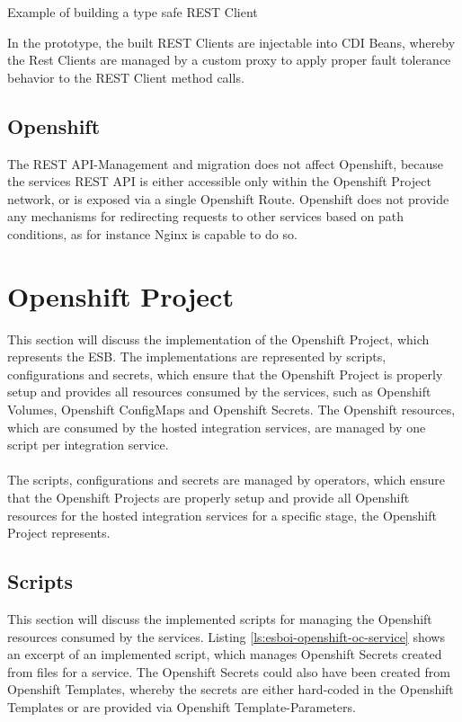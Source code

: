 \begin{listing}[h]
	\caption{Example of building a type safe REST Client}
	\label{ls:esboi-api-client-api-builder-java}
\end{listing}

In the prototype, the built REST Clients are injectable into CDI Beans, whereby the Rest Clients are managed by a custom proxy to apply proper fault tolerance behavior to the REST Client method calls.

\subsection{Openshift}
\label{sec:esbi-api-openshift}
The REST API-Management and migration does not affect Openshift, because the services REST API is either accessible only within the Openshift Project network, or is exposed via a single Openshift Route. Openshift does not provide any mechanisms for redirecting requests to other services based on path conditions, as for instance Nginx is capable to do so. 

\section{Openshift Project}
\label{sec:esbi-openshift}
This section will discuss the implementation of the Openshift Project, which represents the ESB. The implementations are represented by scripts, configurations and secrets, which ensure that the Openshift Project is properly setup and provides all resources consumed by the services, such as Openshift Volumes, Openshift ConfigMaps and Openshift Secrets. The Openshift resources, which are consumed by the hosted integration services, are managed by one script per integration service. 
\\ \\
The scripts, configurations and secrets are managed by operators, which ensure that the Openshift Projects are properly setup and provide all Openshift resources for the hosted integration services for a specific stage, the Openshift Project represents.

\subsection{Scripts}
\label{sec:esbi-openshift-secrets}
This section will discuss the implemented scripts for managing the Openshift resources consumed by the services. Listing \vref{ls:esboi-openshift-oc-service} shows an excerpt of an implemented script, which manages Openshift Secrets created from files for a service. The Openshift Secrets could also have been created from Openshift Templates, whereby the secrets are either hard-coded in the Openshift Templates or are provided via Openshift Template-Parameters.

